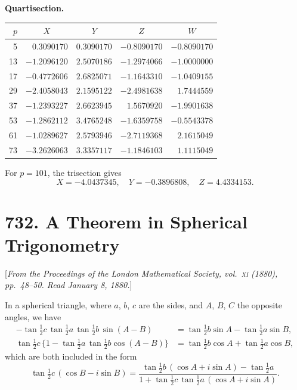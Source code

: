 \documentclass[11pt,a4paper]{book}
\begin{document}
\begin{center}
\textbf{Quartisection.}
\end{center}

\begin{center}
\begin{tabular}{r|rrrr}
\toprule
$p$ & \multicolumn{1}{c}{$X$} & \multicolumn{1}{c}{$Y$} & \multicolumn{1}{c}{$Z$} & \multicolumn{1}{c}{$W$} \\
\midrule
5  & $0.3090170$ & $0.3090170$ & $-0.8090170$ & $-0.8090170$ \\
13 & $-1.2096120$ & $2.5070186$ & $-1.2974066$ & $-1.0000000$ \\
17 & $-0.4772606$ & $2.6825071$ & $-1.1643310$ & $-1.0409155$ \\
29 & $-2.4058043$ & $2.1595122$ & $-2.4981638$ & $1.7444559$ \\
37 & $-1.2393227$ & $2.6623945$ & $1.5670920$ & $-1.9901638$ \\
53 & $-1.2862112$ & $3.4765248$ & $-1.6359758$ & $-0.5543378$ \\
61 & $-1.0289627$ & $2.5793946$ & $-2.7119368$ & $2.1615049$ \\
73 & $-3.2626063$ & $3.3357117$ & $-1.1846103$ & $1.1115049$ \\
\bottomrule
\end{tabular}
\end{center}

For $p=101$, the trisection gives
\[
X=-4.0437345,\quad Y=-0.3896808,\quad Z=4.4334153.
\]

\newpage
\section*{732. A Theorem in Spherical Trigonometry}

[\textit{From the Proceedings of the London Mathematical Society, vol.~\textsc{xi} (1880), pp.~48--50.
Read January 8, 1880.}]

In a spherical triangle, where $a$, $b$, $c$ are the sides, and $A$, $B$, $C$
the opposite angles, we have
\begin{align*}
-\tan\tfrac{1}{2}c\,\tan\tfrac{1}{2}a\,\tan\tfrac{1}{2}b\,\sin(A-B)
&= \tan\tfrac{1}{2}b\sin A - \tan\tfrac{1}{2}a\sin B,\\
\tan\tfrac{1}{2}c\,\{1-\tan\tfrac{1}{2}a\,\tan\tfrac{1}{2}b\cos(A-B)\}
&= \tan\tfrac{1}{2}b\cos A + \tan\tfrac{1}{2}a\cos B,
\end{align*}
which are both included in the form
\[
\tan\tfrac{1}{2}c\,(\cos B - i\sin B)
= \frac{\tan\tfrac{1}{2}b\,(\cos A + i\sin A) - \tan\tfrac{1}{2}a}
{1 + \tan\tfrac{1}{2}c\,\tan\tfrac{1}{2}a\,(\cos A + i\sin A)}.
\]
\end{document}
